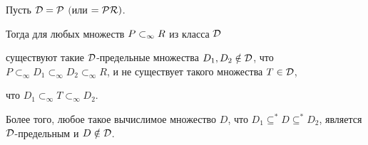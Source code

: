 \begin{thm}\label{th1-3}


Пусть $\cal{D}=\cal{P}$ $($или $=\cal{PR})$.


Тогда для любых множеств ${P}\subset_\infty{R}$ из класса $\cal{D}$


существуют такие $\cal{D}$-предельные множества $D_1,


D_2\notin\cal{D}$, что $P\subset_\infty D_1\subset_\infty


D_2\subset_\infty R$, и не существует такого множества $T\in\cal{D}$,


что $D_1\subset_\infty T\subset_\infty D_2$.





Более того, любое такое вычислимое множество $D$, что $D_1\subseteq^*D


\subseteq^*D_2$, является\linebreak $\cal{D}$-предельным и $D\notin\cal{D}$.


\end{thm}





